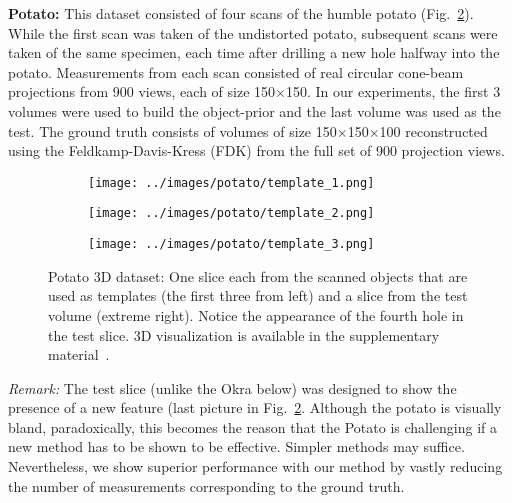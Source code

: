 \documentclass[journal]{IEEEtran}
\begin{document}
\textbf{Potato:} This dataset consisted of four scans of the humble
potato (Fig.~\ref{fig:potato_dataset}). While the first
scan was taken of the undistorted potato, subsequent scans were taken
of the same specimen, each time after drilling a new hole halfway into
the potato. Measurements from each scan consisted of real circular
cone-beam projections from 900 views, each of size
150$\times$150. %
In our experiments,
the first 3 volumes were used to build the object-prior and the last
volume was used as the test. The ground truth consists of volumes of
size 150$\times$150$\times$100 reconstructed using the 
Feldkamp-Davis-Kress (FDK) from the full
set of 900 projection views.
\begin{figure}[!h]
    \begin{subfigure}[b]{0.24\linewidth}
        \texttt{[image: ../images/potato/template\_1.png]}
\captionsetup{labelformat=empty}       
 \caption{}
    \end{subfigure}
    \begin{subfigure}[b]{0.24\linewidth}
        \texttt{[image: ../images/potato/template\_2.png]}
\captionsetup{labelformat=empty}
        \caption{}
     \end{subfigure}
    \begin{subfigure}[b]{0.24\linewidth}
        \texttt{[image: ../images/potato/template\_3.png]}
\captionsetup{labelformat=empty}
        \caption{}
     \end{subfigure}
    \begin{subfigure}[b]{0.235\linewidth}
\captionsetup{labelformat=empty}
\caption{}
\label{fig:potato3D_test}
     \end{subfigure}
      \caption{Potato 3D dataset: One slice each from the scanned
        objects that are used as templates (the first three from
        left) and a slice from the test volume (extreme right). Notice
        the appearance of the fourth hole in the test slice. 3D visualization is available
      in the supplementary material~\cite{supp_paper}.}
\label{fig:potato_dataset}
\end{figure}

\textit{Remark:} The test slice (unlike the Okra below) was designed
to show the presence of a new feature (last picture in
Fig.~\ref{fig:potato_dataset}. Although the potato is visually bland,
paradoxically, this becomes the reason that the Potato is challenging
if a new method has to be shown to be effective.  Simpler methods may
suffice.  Nevertheless, we show superior performance with our method by
vastly reducing the number of measurements corresponding to the ground truth.
\end{document}
